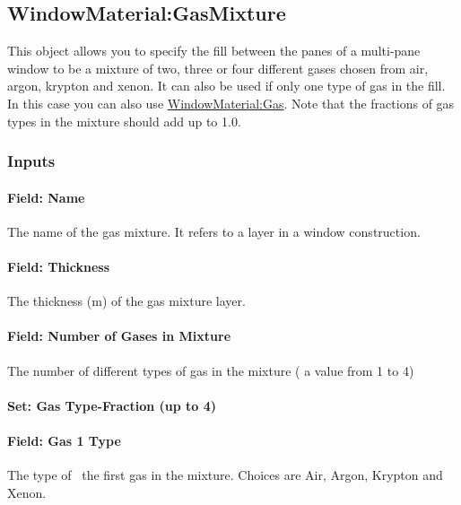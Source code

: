 \subsection{WindowMaterial:GasMixture}\label{windowmaterialgasmixture}

This object allows you to specify the fill between the panes of a multi-pane window to be a mixture of two, three or four different gases chosen from air, argon, krypton and xenon. It can also be used if only one type of gas in the fill. In this case you can also use \hyperref[windowmaterialgas]{WindowMaterial:Gas}. Note that the fractions of gas types in the mixture should add up to 1.0.

\subsubsection{Inputs}\label{inputs-17-009}

\paragraph{Field: Name}\label{field-name-11-014}

The name of the gas mixture. It refers to a layer in a window construction.

\paragraph{Field: Thickness}\label{field-thickness-4}

The thickness (m) of the gas mixture layer.

\paragraph{Field: Number of Gases in Mixture}\label{field-number-of-gases-in-mixture}

The number of different types of gas in the mixture ( a value from 1 to 4)

\paragraph{Set: Gas Type-Fraction (up to 4)}\label{set-gas-type-fraction-up-to-4}

\paragraph{Field: Gas 1 Type}\label{field-gas-1-type}

The type of~ the first gas in the mixture. Choices are Air, Argon, Krypton and Xenon.

